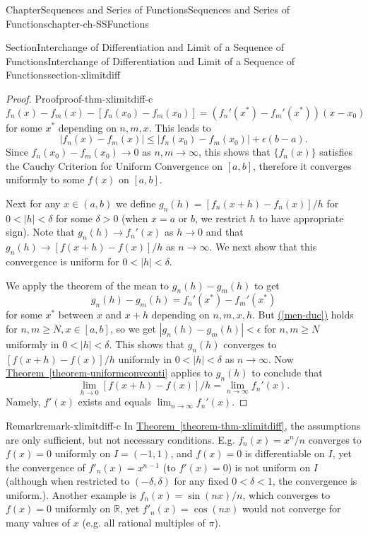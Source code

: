 \documentclass[oneside,10pt,]{book}
\newcommand{\xreffont}{\relax}
\numberwithin{equation}{section}
\newcommand{\lt}{<}
\begin{document}
\begin{chapterptx}{Chapter}{Sequences and Series of Functions}{}{Sequences and Series of Functions}{}{}{chapter-ch-SSFunctions}
\begin{sectionptx}{Section}{Interchange of Differentiation and Limit of a Sequence of  Functions}{}{Interchange of Differentiation and Limit of a Sequence of  Functions}{}{}{section-xlimitdiff}
\begin{proof}{Proof}{}{proof-thm-xlimitdiff-c}
\begin{equation*}
f_n(x)-f_m(x)-\left[ f_n(x_0)-f_m(x_0)\right]=\left(f_n'(x^*)-f_m'(x^*)\right)(x-x_0)
\end{equation*}
for some \(x^*\) depending on \(n, m, x\). This leads to%
\begin{equation*}
\left| f_n(x)-f_m(x)\right| \le \left| f_n(x_0)-f_m(x_0)\right| +  \epsilon (b-a).
\end{equation*}
Since \(f_n(x_0)-f_m(x_0) \to 0\) as \(n, m \to \infty\), this shows that \(\{f_n(x)\}\) satisfies the Cauchy Criterion for Uniform Convergence on \([a, b]\), therefore it converges uniformly to some \(f(x)\) on \([a, b]\).%
\par
Next for any \(x\in (a, b)\) we define \(g_n(h)=\left[f_n(x+h)-f_n(x)\right]/h\) for \(0 \lt |h| \lt \delta\) for some \(\delta >0\) (when \(x=a\) or \(b\), we restrict \(h\) to have appropriate sign). Note that \(g_n(h)\to f_n'(x)\) as \(h\to 0\) and that \(g_n(h)\to \left[f(x+h)-f(x)\right]/h\) as \(n\to \infty\). We next show that this convergence is uniform for \(0 \lt |h| \lt \delta\).%
\par
We apply the theorem of the mean to \(g_n(h)-g_m(h)\) to get%
\begin{equation*}
g_n(h)-g_m(h)=f_n'(x^*)-f_m'(x^*)
\end{equation*}
for some \(x^*\) between \(x\) and \(x+h\) depending on \(n, m, x, h\). But \hyperref[men-duc]{({\xreffont\ref{men-duc}})} holds for \(n, m\ge N, x\in [a, b]\), so we get \(| g_n(h)-g_m(h) | \lt \epsilon\) for \(n, m\ge N\) uniformly in \(0 \lt |h| \lt \delta\). This shows that \(g_n(h)\) converges to \(\left[f(x+h)-f(x)\right]/h\) uniformly in \(0 \lt |h| \lt \delta\) as \(n\to \infty\). Now \hyperref[theorem-uniformconvconti]{Theorem~{\xreffont\ref{theorem-uniformconvconti}}} applies to \(g_n(h)\) to conclude that%
\begin{equation*}
\lim_{h\to 0} \left[f(x+h)-f(x)\right]/h = \lim_{n\to \infty} f_n'(x).
\end{equation*}
Namely, \(f'(x)\) exists and equals \(\lim_{n\to \infty} f_n'(x)\).%
\end{proof}
\begin{remark}{Remark}{}{remark-xlimitdiff-c}%
In \hyperref[theorem-thm-xlimitdiff]{Theorem~{\xreffont\ref{theorem-thm-xlimitdiff}}}, the assumptions are only sufficient, but not necessary conditions.  E.g. \(f_n(x)= x^n/n\) converges to \(f(x)=0\) uniformly on \(I=(-1,1)\), and \(f(x)=0\) is differentiable on \(I\), yet the convergence of \(f'_n(x)=x^{n-1}\) (to \(f'(x)=0\)) is not uniform on \(I\) (although when restricted to \((-\delta, \delta)\) for any fixed \(0 < \delta < 1\), the convergence is uniform.). Another example is \(f_n(x)= \sin (nx)/n\), which converges to \(f(x)=0\) uniformly on \(\mathbb R\), yet \(f'_n(x)= \cos (nx)\) would not converge for many values of \(x\) (e.g. all rational multiples of \(\pi\)).\end{remark}

\end{sectionptx}
\end{chapterptx}
\end{document}

